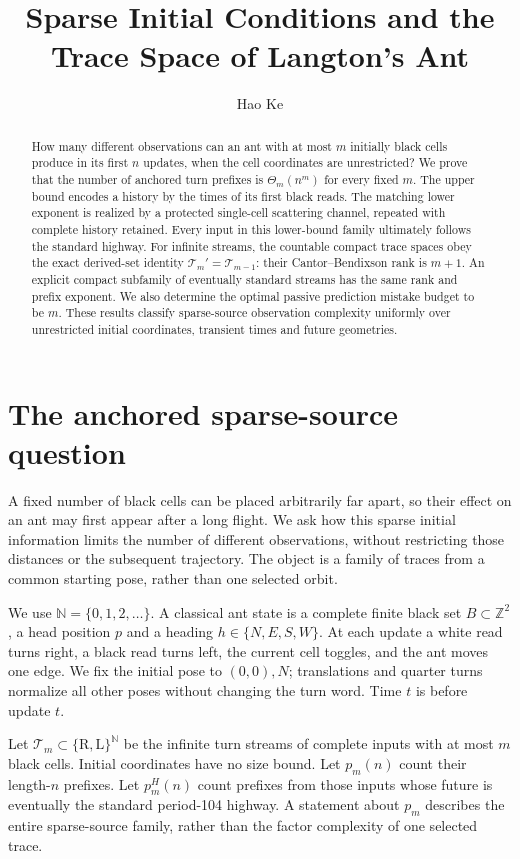 \documentclass[11pt]{article}
\title{Sparse Initial Conditions and the Trace Space of Langton's Ant}
\author{Hao Ke}
\date{}
\theoremstyle{definition}\newtheorem{definition}[theorem]{Definition}
\theoremstyle{remark}\newtheorem{remark}[theorem]{Remark}
\newcommand{\Tr}{\mathcal T}
\newcommand{\N}{\mathbb N}
\newcommand{\Z}{\mathbb Z}
\newcommand{\Rr}{\mathrm R}
\newcommand{\Ll}{\mathrm L}
\begin{document}
\maketitle
\begin{abstract}
How many different observations can an ant with at most $m$ initially black
cells produce in its first $n$ updates, when the cell coordinates are unrestricted?
We prove that the number of anchored turn prefixes is $\Theta_m(n^m)$ for every
fixed $m$. The upper bound encodes a history by the times of its first black
reads. The matching lower exponent is realized by a protected single-cell
scattering channel, repeated with complete history retained. Every input in
this lower-bound family ultimately follows the standard highway.
For infinite streams, the countable compact trace spaces obey the exact
derived-set identity $\Tr_m'=\Tr_{m-1}$: their Cantor--Bendixson rank is $m+1$.
An explicit compact subfamily of eventually standard streams has the same
rank and prefix exponent. We also determine the optimal passive prediction
mistake budget to be $m$. These results classify sparse-source observation complexity uniformly over
unrestricted initial coordinates, transient times and future geometries.
\end{abstract}

\section{The anchored sparse-source question}
A fixed number of black cells can be placed arbitrarily far apart, so their
effect on an ant may first appear after a long flight. We ask how this sparse
initial information limits the number of different observations, without
restricting those distances or the subsequent trajectory. The object is a
family of traces from a common starting pose, rather than one selected orbit.

We use $\N=\{0,1,2,\ldots\}$.
A classical ant state is a complete finite black set $B\subset\Z^2$, a head
position $p$ and a heading $h\in\{N,E,S,W\}$. At each update a white read turns
right, a black read turns left, the current cell toggles, and the ant moves one
edge. We fix the initial pose to $(0,0),N$; translations and quarter turns
normalize all other poses without changing the turn word. Time $t$ is before
update $t$.

Let $\Tr_m\subset\{\Rr,\Ll\}^{\N}$ be the infinite turn streams of complete
inputs with at most $m$ black cells. Initial coordinates have no size bound.
Let $p_m(n)$ count their length-$n$ prefixes. Let $p_m^H(n)$ count prefixes from
those inputs whose future is eventually the standard period-104 highway.
A statement about $p_m$ describes the entire sparse-source family, rather than
the factor complexity of one selected trace.
\end{document}
